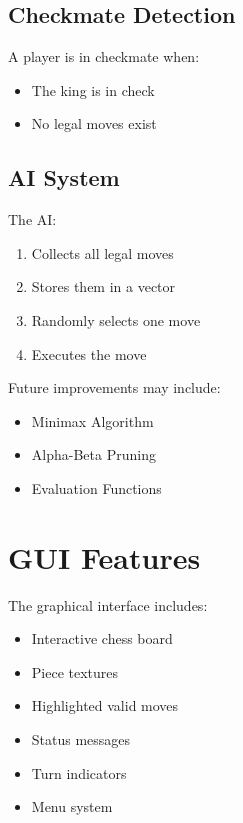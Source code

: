 \documentclass[11pt]{article}
\begin{document}

\subsection{Checkmate Detection}

A player is in checkmate when:

\begin{itemize}
    \item The king is in check
    \item No legal moves exist
\end{itemize}


\subsection{AI System}

The AI:

\begin{enumerate}
    \item Collects all legal moves
    \item Stores them in a vector
    \item Randomly selects one move
    \item Executes the move
\end{enumerate}

Future improvements may include:

\begin{itemize}
    \item Minimax Algorithm
    \item Alpha-Beta Pruning
    \item Evaluation Functions
\end{itemize}


\section{GUI Features}

The graphical interface includes:

\begin{itemize}
    \item Interactive chess board
    \item Piece textures
    \item Highlighted valid moves
    \item Status messages
    \item Turn indicators
    \item Menu system
\end{itemize}
\end{document}
